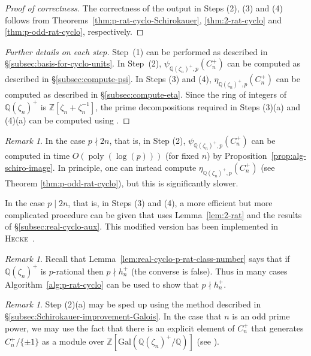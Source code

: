 \documentclass[12pt, a4paper, usenames]{amsart}
\newcommand{\Z}{\mathbb{Z}}
\newcommand{\Q}{\mathbb{Q}}
\theoremstyle{plain}
\theoremstyle{remark}
\newtheorem{remark}[theorem]{Remark}
\theoremstyle{definition}
\newcommand{\Gal}{\mathrm{Gal}}
\DeclareMathOperator{\poly}{poly}
\begin{document}
\begin{proof}[Proof of correctness]
The correctness of the output in Steps (2), (3)
and (4) follows from Theorems~\ref{thm:p-rat-cyclo-Schirokauer},
\ref{thm:2-rat-cyclo} and \ref{thm:p-odd-rat-cyclo}, respectively.
\end{proof}

\begin{proof}[Further details on each step]
Step~(1) can be performed as described in \S \ref{subsec:basis-for-cyclo-units}.
In Step~(2), $\psi_{\Q(\zeta_{n})^{+},p}(C_{n}^{+})$ can be computed 
as described in \S \ref{subsec:compute-psi}.
In Steps (3) and (4), $\eta_{\Q(\zeta_{n})^{+},p}(C_{n}^{+})$ can be computed 
as described in \S \ref{subsec:compute-eta}.
Since  the ring of integers of $\Q(\zeta_{n})^{+}$ is $\Z[\zeta_{n}+\zeta_{n}^{-1}]$,
the prime decompositions required in Steps (3)(a) and (4)(a)
can be computed using \cite[Theorem~4.8.13]{MR1228206}. 
\end{proof}

\begin{remark}\label{rmk:alg-cyclo-p-rat-complexity}
In the case $p \nmid 2n$, that is, in Step (2), 
$\psi_{\Q(\zeta_{n})^{+},p}(C_{n}^{+})$ can be computed in time $O(\poly(\log(p)))$
(for fixed $n$) by Proposition~\ref{prop:alg-schiro-image}.
In principle, one can instead compute
$\eta_{\Q(\zeta_{n})^{+},p}(C_{n}^{+})$ (see Theorem 
\ref{thm:p-odd-rat-cyclo}), but this is significantly slower.

In the case $p \mid 2n$, that is, in Steps (3) and (4), 
a more efficient but more complicated procedure 
can be given that uses Lemma~\ref{lem:2-rat} and the results of 
\S \ref{subsec:real-cyclo-aux}. 
This modified version has been implemented in \textsc{Hecke}~\cite{MR3703682}.
\end{remark}

\begin{remark}
Recall that Lemma~\ref{lem:real-cyclo-p-rat-class-number} says that if $\Q(\zeta_{n})^{+}$
is $p$-rational then $p \nmid h_{n}^{+}$ (the converse is false).
Thus in many cases Algorithm~\ref{alg:p-rat-cyclo} can be used to show that 
$p \nmid h_{n}^{+}$.
\end{remark}

\begin{remark}\label{rmk:cyclo-Galois-action}
Step (2)(a) may be sped up using the method described in 
\S \ref{subsec:Schirokauer-improvement-Galois}.
In the case that $n$ is an odd prime power, we may use the fact that 
there is an explicit element of $C_{n}^{+}$ that generates $C_{n}^{+} / \{\pm 1\}$ 
as a module over $\Z[\Gal(\Q(\zeta_{n})^{+}/\Q)]$ (see \cite[Proposition~8.11]{MR1421575}).
\end{remark}
\end{document}
